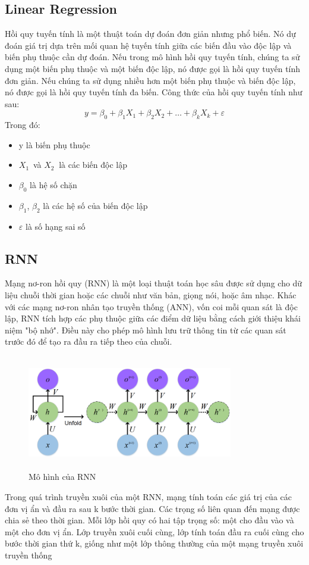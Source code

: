 \documentclass[conference]{IEEEtran}
\begin{document}
\subsection{\textbf{Linear Regression}}
Hồi quy tuyến tính là một thuật toán dự đoán đơn giản nhưng phổ biến. Nó dự đoán giá trị dựa trên mối quan hệ tuyến tính giữa các biến đầu vào độc lập và biến phụ thuộc cần dự đoán. Nếu trong mô hình hồi quy tuyến tính, chúng ta sử dụng một biến phụ thuộc và một biến độc lập, nó được gọi là hồi quy tuyến tính đơn giản. Nếu chúng ta sử dụng nhiều hơn một biến phụ thuộc và biến độc lập, nó được gọi là hồi quy tuyến tính đa biến. Công thức của hồi quy tuyến tính như sau:
\begin{equation}
y = \beta_0 + \beta_1 X_1 + \beta_2 X_2 + \dots + \beta_k X_k + \varepsilon
\end{equation}
Trong đó:
\begin{itemize}
    \item y là biến phụ thuộc
    \item \( X_{1\ } \) và \( X_2\ \) là các biến độc lập
    \item $\beta_0$ là hệ số chặn
    \item $\beta_1$, $\beta_2$ là các hệ số của biến độc lập
    \item $\varepsilon$ là số hạng sai số
\end{itemize}

\subsection{\textbf{RNN}}
Mạng nơ-ron hồi quy (RNN) là một loại thuật toán học sâu được sử dụng cho dữ liệu chuỗi thời gian hoặc các chuỗi như văn bản, giọng nói, hoặc âm nhạc. Khác với các mạng nơ-ron nhân tạo truyền thống (ANN), vốn coi mỗi quan sát là độc lập, RNN tích hợp các phụ thuộc giữa các điểm dữ liệu bằng cách giới thiệu khái niệm "bộ nhớ". Điều này cho phép mô hình lưu trữ thông tin từ các quan sát trước đó để tạo ra đầu ra tiếp theo của chuỗi.
\begin{figure}[H]
    \centering
    \includegraphics[width= 9cm, height= 5cm]{Images/RNN.png}
    \caption{Mô hình của RNN}
\end{figure}
Trong quá trình truyền xuôi của một RNN, mạng tính toán các giá trị của các đơn vị ẩn và đầu ra sau k bước thời gian. Các trọng số liên quan đến mạng được chia sẻ theo thời gian. Mỗi lớp hồi quy có hai tập trọng số: một cho đầu vào và một cho đơn vị ẩn. Lớp truyền xuôi cuối cùng, lớp tính toán đầu ra cuối cùng cho bước thời gian thứ k, giống như một lớp thông thường của một mạng truyền xuôi truyền thống
\end{document}
